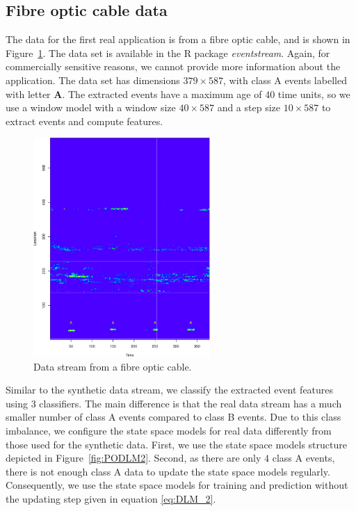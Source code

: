 \documentclass[a4paper,11pt]{article}
\begin{document}
\subsection{Fibre optic cable data}\label{sec:FibreOpticExperiment}

The data for the first real application is from a fibre optic cable, and is shown in Figure~\ref{fig:Real_World_Data_Stream}. The data set is available in the R package \textit{eventstream}. Again, for commercially sensitive reasons, we cannot provide more information about the application. The data set has dimensions $379 \times 587$, with class A events labelled with letter \textbf{A}. The extracted events have a maximum age of 40 time units, so we use a window model with a window size $40 \times 587$ and a step size $10 \times 587$ to extract events and compute features.

\begin{figure}[!b]
	\centering
	\includegraphics[width=0.6\textwidth]{./Graphics/Real_World_stream.pdf}
	\caption{Data stream from a fibre optic cable.}
	\label{fig:Real_World_Data_Stream}
\end{figure}

Similar to the synthetic data stream, we classify the extracted event features using 3 classifiers. The main difference is that the real data stream has a much smaller number of class A events compared to class B events. Due to this class imbalance, we configure the state space models for real data differently from those used for the synthetic data. First, we use the state space models structure depicted in Figure~\ref{fig:PODLM2}. Second, as there are only $4$ class A events, there is not enough class A data to update the state space models regularly. Consequently, we use the state space models for training and prediction without the updating step given in equation \eqref{eq:DLM_2}.
\end{document}
